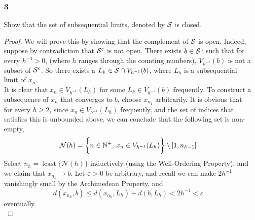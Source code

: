 \documentclass[../main.tex]{subfiles}
\begin{document}
\providecommand{\xn}{\{x_n\}}
\providecommand{\least}{\operatorname{least}}
\subsubsection*{3}
\begin{wts}
    Show that the set of subsequential limits, denoted by $\mathcal{S}$ is closed.
\end{wts}
\begin{proof}
    We will prove this by showing that the complement of $\mathcal{S}$ is open. Indeed, suppose by contradiction that $\mathcal{S}^c$ is not open. There exists $b\in\mathcal{S}^c$ such that for every $h^{-1}>0$, (where $h$ ranges through the counting numbers), $V_{h^{-1}}(b)$ is not a subset of $\mathcal{S}^c$. So there exists a $L_h\in\mathcal{S}\cap V_{h^{-1}}(b)$, where $L_h$ is a subsequential limit of $x_n$.\\
    
    It is clear that $x_n\in V_{h^{-1}}(L_h)$ for some $L_h\in V_{h^{-1}}(b)$ frequently. To construct a subsequence of $x_n$ that converges to $b$, choose $x_{n_1}$ arbitrarily. It is obvious that for every $h\geq2$, since $x_n\in V_{h^{-1}}(L_h)$ frequently, and the set of indices that satisfies this is unbounded above, we can conclude that the following set is non-empty,
    \[\mathcal{N}(h)=\biggl\{n\in\mathbb{N}^+,\,x_n\in V_{h^{-1}}(L_h)\biggr\}\setminus[1,n_{h-1}]\]
    Select $n_h=\least\{\mathcal{N}(h)\}$ inductively (using the Well-Ordering Property), and we claim that $x_{n_h}\to b$. Let $\varepsilon>0$ be arbitrary, and recall  we can make $2h^{-1}$ vanishingly small by the Archimedean Property, and
    \[d(x_{n_h},b)\leq d(x_{n_h},L_h) + d(b, L_h)<2h^{-1}<\varepsilon\]
    eventually.\\
\end{proof}
\end{document}

